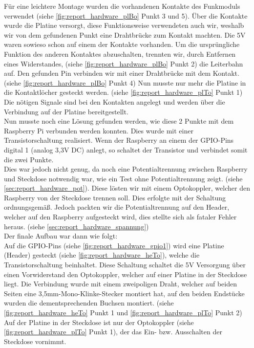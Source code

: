 Für eine leichtere Montage wurden die vorhandenen Kontakte des Funkmoduls verwendet (siehe \autoref{fig:report_hardware_plBo} Punkt 3 und 5). Über die Kontakte wurde die Platine versorgt, diese Funktionsweise verwendeten auch wir, weshalb wir von dem gefundenen Punkt eine Drahtbrücke zum Kontakt machten. Die 5V waren sowieso schon auf einem der Kontakte vorhanden. Um die ursprüngliche Funktion des anderen Kontaktes abzuschalten, trennten wir, durch Entfernen eines Widerstandes, (siehe \autoref{fig:report_hardware_plBo} Punkt 2) die Leiterbahn auf. Den gefunden Pin verbinden wir mit einer Drahtbrücke mit dem Kontakt. (siehe \autoref{fig:report_hardware_plBo} Punkt 4) Nun musste nur mehr die Platine in die Kontaktlöcher gesteckt werden. (siehe \autoref{fig:report_hardware_plTo} Punkt 1) Die nötigen Signale sind bei den Kontakten angelegt und werden über die Verbindung auf der Platine bereitgestellt.\\
Nun musste noch eine Lösung gefunden werden, wie diese 2 Punkte mit dem Raspberry Pi verbunden werden konnten. Dies wurde mit einer Transistorschaltung realisiert. Wenn der Raspberry an einem der GPIO-Pins digital 1 (analog 3,3V DC) anlegt, so schaltet der Transistor und verbindet somit die zwei Punkte. \\
Dies war jedoch nicht genug, da noch eine Potentialtrennung zwischen Raspberry und Steckdose  notwendig war, wie ein Test ohne Potentialtrennung zeigt. (siehe \autoref{sec:report_hardware_pot}). Diese lösten wir mit einem Optokoppler, welcher den Raspberry von der Steckdose trennen soll. Dies erfolgte mit der Schaltung ordnungsgemäß. Jedoch packten wir die Potentialtrennung auf den Header, welcher auf den Raspberry aufgesteckt wird, dies stellte sich als fataler Fehler heraus. (siehe \autoref{sec:report_hardware_spannung})\\
Der finale Aufbau war dann wie folgt:\\
Auf die GPIO-Pins (siehe \autoref{fig:report_hardware_gpio1}) wird eine Platine (Header) gesteckt (siehe \autoref{fig:report_hardware_heTo}), welche die Transistorschaltung beinhaltet. Diese Schaltung schaltet die 5V Versorgung über einen Vorwiderstand den Optokoppler, welcher auf einer Platine in der Steckdose liegt. Die Verbindung wurde mit einem zweipoligen Draht, welcher auf beiden Seiten eine 3,5mm-Mono-Klinke-Stecker montiert hat, auf den beiden Endstücke wurden die dementsprechenden Buchsen montiert. (siehe \autoref{fig:report_hardware_heTo} Punkt 1 und \autoref{fig:report_hardware_plTo} Punkt 2) Auf der Platine in der Steckdose ist nur der Optokoppler (siehe \autoref{fig:report_hardware_plTo} Punkt 1), der das Ein- bzw. Ausschalten der Steckdose vornimmt.\\\\
